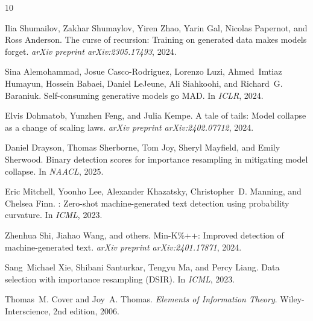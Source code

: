 \documentclass[11pt]{article}
\begin{document}
\begin{thebibliography}{10}

Ilia Shumailov, Zakhar Shumaylov, Yiren Zhao, Yarin Gal, Nicolas Papernot, and Ross Anderson.
\newblock The curse of recursion: Training on generated data makes models forget.
\newblock \emph{arXiv preprint arXiv:2305.17493}, 2024.

Sina Alemohammad, Josue Casco-Rodriguez, Lorenzo Luzi, Ahmed~Imtiaz Humayun, Hossein Babaei, Daniel LeJeune, Ali Siahkoohi, and Richard~G. Baraniuk.
\newblock Self-consuming generative models go {MAD}.
\newblock In \emph{ICLR}, 2024.

Elvis Dohmatob, Yunzhen Feng, and Julia Kempe.
\newblock A tale of tails: Model collapse as a change of scaling laws.
\newblock \emph{arXiv preprint arXiv:2402.07712}, 2024.

Daniel Drayson, Thomas Sherborne, Tom Joy, Sheryl Mayfield, and Emily Sherwood.
\newblock Binary detection scores for importance resampling in mitigating model collapse.
\newblock In \emph{NAACL}, 2025.

Eric Mitchell, Yoonho Lee, Alexander Khazatsky, Christopher~D. Manning, and Chelsea Finn.
: Zero-shot machine-generated text detection using probability curvature.
\newblock In \emph{ICML}, 2023.

Zhenhua Shi, Jiahao Wang, and others.
\newblock Min-{K}\%++: Improved detection of machine-generated text.
\newblock \emph{arXiv preprint arXiv:2401.17871}, 2024.

Sang~Michael Xie, Shibani Santurkar, Tengyu Ma, and Percy Liang.
\newblock Data selection with importance resampling ({DSIR}).
\newblock In \emph{ICML}, 2023.

Thomas~M. Cover and Joy~A. Thomas.
\newblock \emph{Elements of Information Theory}.
\newblock Wiley-Interscience, 2nd edition, 2006.

\end{thebibliography}
\end{document}
